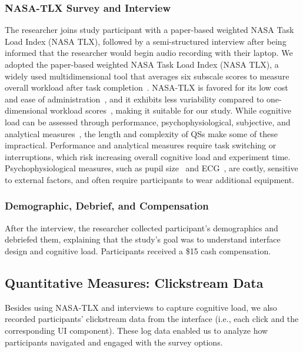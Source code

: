 {\subsubsection{NASA-TLX Survey and Interview}
The researcher joins study participant with a paper-based weighted NASA Task Load Index (NASA TLX), followed by a semi-structured interview after being informed that the researcher would begin audio recording with their laptop. We adopted the paper-based weighted NASA Task Load Index (NASA TLX), a widely used multidimensional tool that averages six subscale scores to measure overall workload after task completion~\cite{hart1988development, hartNasaTaskLoadIndex2006, cain2007review}. NASA-TLX is favored for its low cost and ease of administration~\cite{gaoMentalWorkloadMeasurement2013}, and it exhibits less variability compared to one-dimensional workload scores~\cite{rubioEvaluationSubjectiveMental2004}, making it suitable for our study. While cognitive load can be assessed through performance, psychophysiological, subjective, and analytical measures~\cite{gaoMentalWorkloadMeasurement2013}, the length and complexity of QSs make some of these impractical. Performance and analytical measures require task switching or interruptions, which risk increasing overall cognitive load and experiment time. Psychophysiological measures, such as pupil size~\cite{palinkoEstimatingCognitiveLoad2010} and ECG~\cite{haapalainenPsychophysiologicalMeasuresAssessing2010}, are costly, sensitive to external factors, and often require participants to wear additional equipment.}

\subsubsection{Demographic, Debrief, and Compensation}
After the interview, the researcher collected participant's demographics and debriefed them, explaining that the study's goal was to understand interface design and cognitive load. Participants received a \$15 cash compensation.

\subsection{Quantitative Measures: Clickstream Data}
\label{subsec:measures}

Besides using NASA-TLX and interviews to capture cognitive load, we also recorded participants' clickstream data from the interface (i.e., each click and the corresponding UI component). These log data enabled us to analyze how participants navigated and engaged with the survey options.

